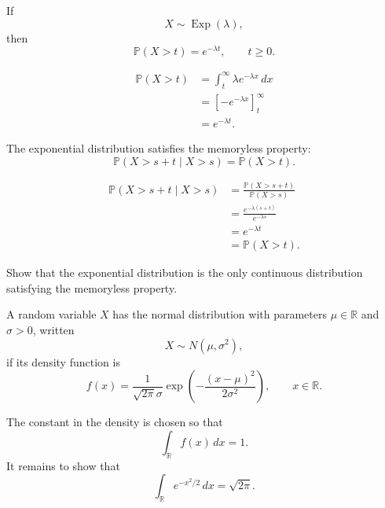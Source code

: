 \begin{propositionenv}
If
\[
    X\sim\operatorname{Exp}(\lambda),
\]
then
\[
    \mathbb P(X>t)=e^{-\lambda t},
    \qquad t\ge0.
\]
\end{propositionenv}

\begin{proofenv}
\[
\begin{aligned}
    \mathbb P(X>t)
    &=
    \int_t^\infty
    \lambda e^{-\lambda x}\,dx\\
    &=
    \left[-e^{-\lambda x}\right]_t^\infty\\
    &=
    e^{-\lambda t}.
\end{aligned}
\]
\end{proofenv}


\begin{propositionenv}
The exponential distribution satisfies the memoryless property:
\[
    \mathbb P(X>s+t\mid X>s)
    =
    \mathbb P(X>t).
\]
\end{propositionenv}

\begin{proofenv}
\[
\begin{aligned}
    \mathbb P(X>s+t\mid X>s)
    &=
    \frac{\mathbb P(X>s+t)}
    {\mathbb P(X>s)}\\
    &=
    \frac{e^{-\lambda(s+t)}}
    {e^{-\lambda s}}\\
    &=
    e^{-\lambda t}\\
    &=
    \mathbb P(X>t).
\end{aligned}
\]
\end{proofenv}

\begin{exerciseenv}
Show that the exponential distribution is the only continuous distribution
satisfying the memoryless property.
\end{exerciseenv}

\begin{definitionenv}
A random variable $X$ has the normal distribution with parameters
$\mu\in\mathbb R$ and $\sigma>0$, written
\[
    X\sim N(\mu,\sigma^2),
\]
if its density function is
\[
    f(x)
    =
    \frac1{\sqrt{2\pi}\sigma}
    \exp\left(
        -\frac{(x-\mu)^2}{2\sigma^2}
    \right),
    \qquad x\in\mathbb R.
\]
\end{definitionenv}

\begin{remark}
The constant in the density is chosen so that
\[
    \int_{\mathbb R}f(x)\,dx=1.
\]
It remains to show that
\[
    \int_{\mathbb R}e^{-x^2/2}\,dx=\sqrt{2\pi}.
\]
\end{remark}

